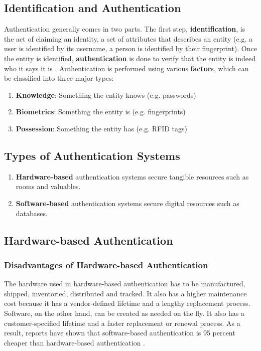 \subsection{Identification and Authentication}

Authentication generally comes in two parts. The first step, \textbf{identification}, is the act of claiming an identity, a set of attributes that describes an entity (e.g. a user is identified by its username, a person is identified by their fingerprint). Once the entity is identified, \textbf{authentication} is done to verify that the entity is indeed who it says it is \cite{Pasupathinathan2009}. Authentication is performed using various \textbf{factor}s, which can be classified into three major types:
\begin{enumerate}
\item \textbf{Knowledge}: Something the entity knows (e.g. passwords)
\item \textbf{Biometrics}: Something the entity is (e.g. fingerprints)
\item \textbf{Possession}: Something the entity has (e.g. RFID tags) 
\end{enumerate}

\subsection{Types of Authentication Systems}
\begin{enumerate}
    \item \textbf{Hardware-based} authentication systems secure tangible resources such as rooms and valuables.
    \item \textbf{Software-based} authentication systems secure digital resources such as databases.
\end{enumerate}

\subsection{Hardware-based Authentication}
\subsubsection{Disadvantages of Hardware-based Authentication}
The hardware used in hardware-based authentication has to be manufactured, shipped, inventoried, distributed and tracked. It also has a higher maintenance cost because it has a vendor-defined lifetime and a lengthy replacement process. Software, on the other hand, can be created as needed on the fly. It also has a customer-specified lifetime and a faster replacement or renewal process. As a result, reports have shown that software-based authentication is 95 percent cheaper than hardware-based authentication \cite{InfoSecurity2012}.
    
